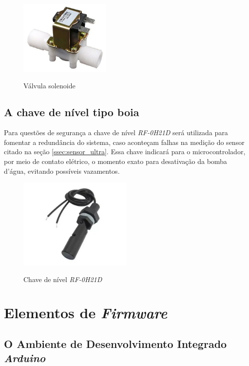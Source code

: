  \begin{figure}[H]
 	\centering
 	\caption{Válvula solenoide}
 	\includegraphics[width=0.4\textwidth]{figuras/solenoide.png}
 	\label{fig:solenoide}
 \end{figure}

\subsection{A chave de nível tipo boia}

Para questões de segurança a chave de nível \textit{RF-0H21D} será utilizada para fomentar a redundância do sistema, caso aconteçam falhas na medição do sensor citado na seção \ref{ssec:sensor_ultra}. Essa chave indicará para o microcontrolador, por meio de contato elétrico, o momento exato para desativação da bomba d'água, evitando possíveis vazamentos. 

 \begin{figure}[H]
	\centering
	\caption{Chave de nível \textit{RF-0H21D}}
	\includegraphics[width=0.5\textwidth]{figuras/chave_boia.png}
	\label{fig:chaveboia}
\end{figure}


\section{Elementos de \textit{Firmware}}
\subsection{O Ambiente de Desenvolvimento Integrado \textit{Arduino}}

